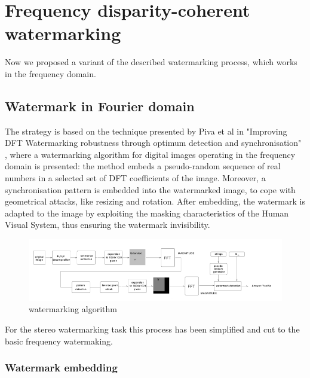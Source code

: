 \chapter{Frequency disparity-coherent watermarking}
\label{dft}

Now we proposed a variant of the described watermarking process, which works in the frequency domain.

\section{Watermark in Fourier domain}

The strategy is based on the technique presented by Piva et al in "Improving DFT Watermarking robustness through optimum detection and synchronisation" \cite{PIVA}, where a watermarking algorithm for digital images operating in the frequency domain is presented: the method embeds a pseudo-random sequence of real numbers in a selected set of DFT coefficients of the image. Moreover, a synchronisation pattern is embedded into the watermarked image, to cope with geometrical attacks, like resizing and rotation. After embedding, the watermark is adapted to the image by exploiting the masking characteristics of the Human Visual System, thus ensuring the watermark invisibility.\newline
\begin{figure}[h!]
\centering
\includegraphics[width=1\textwidth]{./img/blocchi.png}
\caption{\small{watermarking algorithm}}
\label{fig:blocchi}
\end{figure}

For the stereo watermarking task this process has been simplified and cut to the basic frequency watermaking.

\subsection{Watermark embedding}

